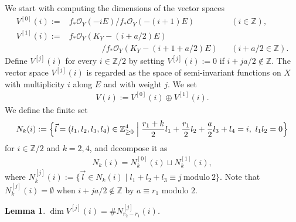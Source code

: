 \documentclass[a4paper,11pt]{amsart}
\newtheorem{lemma}[theorem]{Lemma}
\theoremstyle{definition}
\theoremstyle{remark}
\numberwithin{equation}{section}
\newcommand{\bZ}{{\mathbb Z}}
\newcommand{\cO}{{\mathcal O}}
\begin{document}
We start with computing the dimensions of the vector spaces
\begin{align*}
V^{[0]}(i) := & f_*\cO_Y(-iE)/f_*\cO_Y(-(i+1)E) &&(i \in \bZ),\\
V^{[1]}(i) := & f_*\cO_Y(K_Y-(i+a/2)E)          && \\
& \qquad\qquad /f_*\cO_Y(K_Y-(i+1+a/2)E)        && (i+a/2 \in\bZ).
\end{align*}
Define $V^{[j]}(i)$ for every $i \in \bZ/2$
by setting $V^{[j]}(i):=0$ if $i+ja/2 \not\in \bZ$.
The vector space $V^{[j]}(i)$ is regarded as the space of
semi-invariant functions on $X$
with multiplicity $i$ along $E$ and with weight $j$.
We set
\begin{align*}
V(i):= V^{[0]}(i) \oplus V^{[1]}(i).
\end{align*}
We define the finite set
\begin{align*}
N_k(i):=\Bigl\{\vec{l}=(l_1,l_2,l_3,l_4)\in\bZ_{\ge0}^4 \Bigm|
\frac{r_1+k}{2}l_1+\frac{r_1}{2}l_2+\frac{a}{2}l_3+l_4=i,\ l_1l_2=0\Bigr\}
\end{align*}
for $i \in \bZ/2$ and $k=2,4$,
and decompose it as
\begin{align*}
N_k(i)=N_k^{[0]}(i) \sqcup N_k^{[1]}(i),
\end{align*}
where
$N_k^{[j]}(i) :=\{\vec{l}\in N_k(i) \mid
l_1+l_2+l_3\equiv j \ \textrm{modulo} \ 2\}$.
Note that $N_k^{[j]}(i)=\emptyset$ when $i+ja/2 \not\in \bZ$
by $a\equiv r_1$ modulo $2$.

\begin{lemma}\label{lem:dimension}
$\dim V^{[j]}(i)=\#N_{r_2-r_1}^{[j]}(i)$.
\end{lemma}
\end{document}
